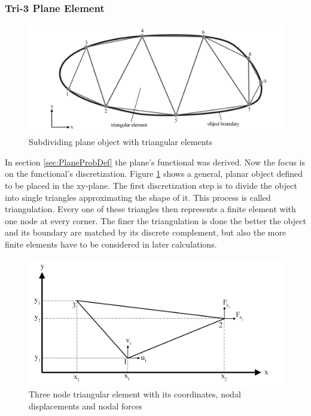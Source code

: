   \subsubsection{Tri-3 Plane Element}
  \begin{figure}%
  	\includegraphics[width=1.0\linewidth]{figures/plane_triangulation}
  	\caption{Subdividing plane object with triangular elements}
  	\label{fig:plane_triangulation}
  \end{figure}
  In section \ref{sec:PlaneProbDef} the plane's functional was derived. Now the focus is on the functional's discretization. Figure \ref{fig:plane_triangulation} shows a general, planar object defined to be placed in the xy-plane. The first discretization step is to divide the object into single triangles approximating the shape of it. This process is called triangulation. Every one of these triangles then represents a finite element with one node at every corner. The finer the triangulation is done the better the object and its boundary are matched by its discrete complement, but also the more finite elements have to be considered in later calculations.
  \begin{figure}
  	\centering
  	\includegraphics[width=1.0\linewidth]{figures/plane_triangle}
  	\caption{Three node triangular element with its coordinates, nodal displacements and nodal forces}
  	\label{fig:plane_triangle}
  \end{figure}
